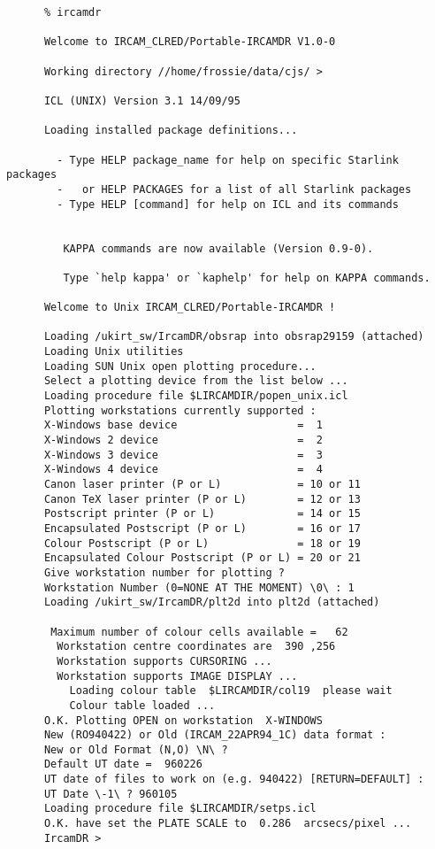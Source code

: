 \begin{small}
\begin{verbatim}
      % ircamdr
 
      Welcome to IRCAM_CLRED/Portable-IRCAMDR V1.0-0
 
      Working directory //home/frossie/data/cjs/ > 
 
      ICL (UNIX) Version 3.1 14/09/95
 
      Loading installed package definitions...
 
        - Type HELP package_name for help on specific Starlink packages
        -   or HELP PACKAGES for a list of all Starlink packages
        - Type HELP [command] for help on ICL and its commands
 
 
         KAPPA commands are now available (Version 0.9-0).
 
         Type `help kappa' or `kaphelp' for help on KAPPA commands.
 
      Welcome to Unix IRCAM_CLRED/Portable-IRCAMDR !
 
      Loading /ukirt_sw/IrcamDR/obsrap into obsrap29159 (attached)
      Loading Unix utilities
      Loading SUN Unix open plotting procedure...
      Select a plotting device from the list below ...
      Loading procedure file $LIRCAMDIR/popen_unix.icl
      Plotting workstations currently supported : 
      X-Windows base device                   =  1
      X-Windows 2 device                      =  2
      X-Windows 3 device                      =  3
      X-Windows 4 device                      =  4
      Canon laser printer (P or L)            = 10 or 11
      Canon TeX laser printer (P or L)        = 12 or 13
      Postscript printer (P or L)             = 14 or 15
      Encapsulated Postscript (P or L)        = 16 or 17
      Colour Postscript (P or L)              = 18 or 19
      Encapsulated Colour Postscript (P or L) = 20 or 21
      Give workstation number for plotting ? 
      Workstation Number (0=NONE AT THE MOMENT) \0\ : 1
      Loading /ukirt_sw/IrcamDR/plt2d into plt2d (attached)
  
       Maximum number of colour cells available =   62
        Workstation centre coordinates are  390 ,256
        Workstation supports CURSORING ...
        Workstation supports IMAGE DISPLAY ...
          Loading colour table  $LIRCAMDIR/col19  please wait
          Colour table loaded ...
      O.K. Plotting OPEN on workstation  X-WINDOWS
      New (RO940422) or Old (IRCAM_22APR94_1C) data format : 
      New or Old Format (N,O) \N\ ? 
      Default UT date =  960226
      UT date of files to work on (e.g. 940422) [RETURN=DEFAULT] : 
      UT Date \-1\ ? 960105
      Loading procedure file $LIRCAMDIR/setps.icl
      O.K. have set the PLATE SCALE to  0.286  arcsecs/pixel ...
      IrcamDR > 
\end{verbatim}
\end{small}


